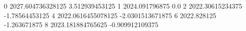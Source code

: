 0 2027.604736328125 3.512939453125
1 2024.091796875 0.0
2 2022.30615234375 -1.78564453125
4 2022.0616455078125 -2.0301513671875
6 2022.828125 -1.263671875
8 2023.181884765625 -0.909912109375
